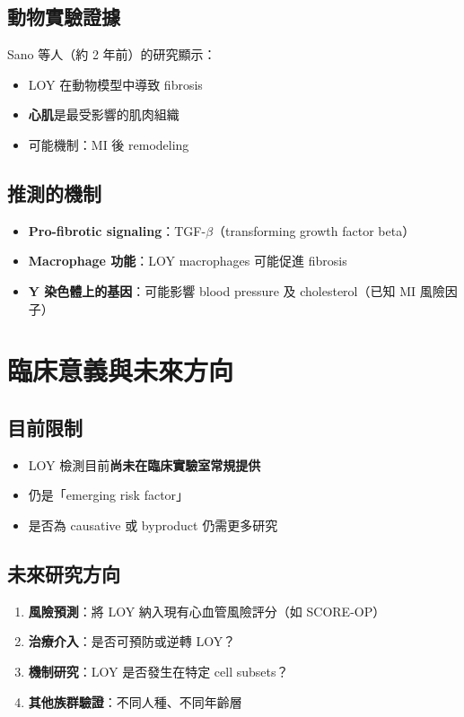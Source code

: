 \documentclass[12pt,a4paper]{article}
\begin{document}
\subsection{動物實驗證據}

Sano 等人（約 2 年前）的研究顯示：
\begin{itemize}
    \item LOY 在動物模型中導致 fibrosis
    \item \textbf{心肌}是最受影響的肌肉組織
    \item 可能機制：MI 後 remodeling
\end{itemize}

\subsection{推測的機制}

\begin{itemize}
    \item \textbf{Pro-fibrotic signaling}：TGF-$\beta$（transforming growth factor beta）
    \item \textbf{Macrophage 功能}：LOY macrophages 可能促進 fibrosis
    \item \textbf{Y 染色體上的基因}：可能影響 blood pressure 及 cholesterol（已知 MI 風險因子）
\end{itemize}

\section{臨床意義與未來方向}

\subsection{目前限制}

\begin{itemize}
    \item LOY 檢測目前\textbf{尚未在臨床實驗室常規提供}
    \item 仍是「emerging risk factor」
    \item 是否為 causative 或 byproduct 仍需更多研究
\end{itemize}

\subsection{未來研究方向}

\begin{enumerate}
    \item \textbf{風險預測}：將 LOY 納入現有心血管風險評分（如 SCORE-OP）
    \item \textbf{治療介入}：是否可預防或逆轉 LOY？
    \item \textbf{機制研究}：LOY 是否發生在特定 cell subsets？
    \item \textbf{其他族群驗證}：不同人種、不同年齡層
\end{enumerate}
\end{document}

